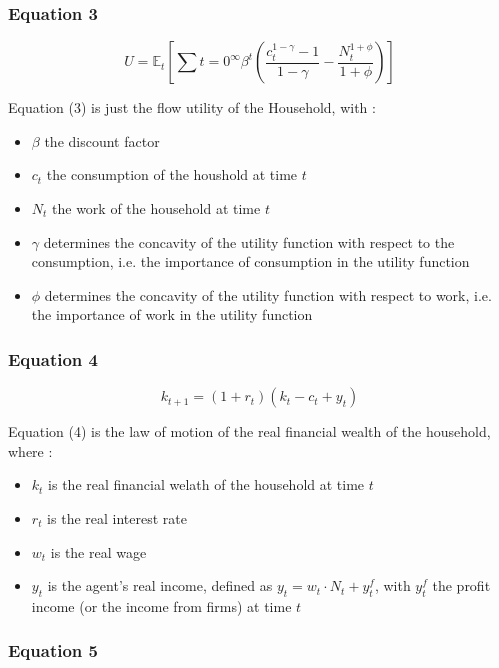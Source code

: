 \documentclass{article}
\begin{document}
\subsubsection*{Equation 3}
\begin{equation}
    U = \mathbb{E}_{t} \left[ \sum{t=0}^{\infty} \beta^{t}\left(\frac{c_{t}^{1-\gamma}-1}{1-\gamma} - \frac{N_{t}^{1+\phi}}{1+\phi}\right)\right]
\end{equation}

Equation (3) is just the flow utility of the Household, with : 
\begin{itemize}
    \item $\beta$ the discount factor
    \item $c_{t}$ the consumption of the houshold at time $t$
    \item $N_{t}$ the work of the household at time $t$
    \item $\gamma$ determines the concavity of the utility function with respect to the consumption, i.e. the importance of consumption in the utility function
    \item $\phi$ determines the concavity of the utility function with respect to work, i.e. the importance of work in the utility function
\end{itemize}


\subsubsection*{Equation 4}
\begin{equation}
    k_{t+1}=(1+r_t)(k_{t}-c_{t}+y_{t})
\end{equation}

Equation (4) is the law of motion of the real financial wealth of the household, where : 
\begin{itemize}
    \item $k_t$ is the real financial welath of the household at time $t$
    \item $r_t$ is the real interest rate
    \item $w_t$ is the real wage
    \item $y_t$ is the agent's real income, defined as $y_t=w_t\cdot N_{t}+y_{t}^{f}$, with $y_{t}^{f}$ the profit income (or the income from firms) at time $t$
\end{itemize}

\subsubsection*{Equation 5}
\end{document}
